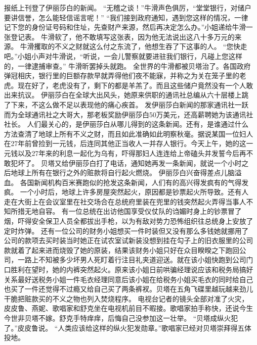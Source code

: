 \documentclass[a4paper,12pt,UTF8,twoside]{ctexbook}
\begin{document}
        报纸上刊登了伊丽莎白的新闻。  
        “无稽之谈！”牛滑声色俱厉，“堂堂银行，对储户要讲信誉，怎么能轻信谣言呢！”  
        “我们接到政府通知，遇到您这样的情况，一律记下您的身份证号码和住址，先查财产来源，然后再决定怎么办。”小姐递给牛滑一张登记表。  
        牛滑软了，他不敢填写这张表，因为他无法说出这八十多万元的来源。  
        牛滑攫取的不义之财就这么付之东流了，他想生吞了下这事的人。  
        “您快走吧。”小姐小声对牛滑说，“听说，一会儿警察就要进驻我们银行，凡碰上您这样的，一律逮捕审查。”  
        牛滑昕罢掉头就跑。  
        全世界的牛滑都被贝塔治了。各国政府弹冠相庆，银行里的巨额存款早就弄得他们夜不能寐，并称之为关在笼子里的老虎。现在好了，老虎没有了，剩下的都是羊羔了。而且这些储户竟然没有一个人敢出来抗议。  
        伊丽莎白在全球大出风头，她原来供职的通讯社总编从六十层楼上跳了下来，不这么做不足以表现他的痛心疾首。  
        发伊丽莎白新闻的那家通讯社一跃而为全球通讯社之大哥大，那老板奖励伊丽莎白50万美元，还高薪聘她为该通讯社社长。  
        人们最关心的，是伊丽莎白从哪儿得到的这条新闻。还有，是谁通过什么方法查清了地球上所有不义之财，而且如此准确如此明察秋毫。据说某国一位妇人在27年前曾捡到一元钱，后连同其他正当收人一并存人银行。今天上午，她的这一元钱以及27年来的利息一起化为乌有，吓得那妇人连连给上帝磕头并发誓今后再不敢犯坏了。  
        贝塔又给伊丽莎白打了电话，通知她再发一条新闻，就说一个小时之后地球上所有在银行之外的赃款将自行起火燃烧。  
        伊丽莎白兴奋得差点儿脑溢血。  
        各国新闻机构百米赛跑似的抢发这条新闻，人们有的高兴得发疯有的气得发疯。  
        一个小时后，地球上许多房屋突然起火，原因都是钞票起火所导致。还有人走在大街上在会议室里在社交场合在总统府里装在兜里的钱突然起火弄得当事人不知所措无地自容。  
        有一位总统在出访他国享受仪仗队的诌媚时身上的钞票冒了烟，吓得安全保卫人员全都拔出手枪，以为有敌对势力恐怖组织往总统身上安放了定时炸弹。  
        还有一位公司的财务小姐想买一件时装但又没有那么多钱她就挪用了公司的款项去买时装当时她正在试农室试新装没想到挂在勾子上的旧衣服里的公司款就着了起来进而烧毁了她的原装，结果该财务小姐只好在众目睽暌之下跑回公司，一路上不知被多少坏男人死盯着行注目礼夹道迎送。就在该小姐快跑到公司门口胜利在望时，她的内裤突然起火。原来该小姐日前哄骗经理说应该和税务局搞好关系最好送税务小姐一件毛衣经理同意后该小姐在给税务小姐买毛衣的同时给自己也买了一件还觉得不过瘾又给自己买了两条裤衩。贝塔在五角飞碟里越玩越来劲儿干脆把赃款买的不义之物也列入焚烧程序。  
        电视台记者的镜头全部对准了火灾，皮皮鲁、燕妮、歌唱家和舒克坐在电视机前目不暇接。歌唱家拍手称快，还说今生今世非贝塔不嫁。舒克手特痒痒，后悔自己没参加这一壮举。  
        “贝塔成纵火犯了。”皮皮鲁说。  
        “人类应该给这样的纵火犯发勋章。”歌唱家已经对贝塔崇拜得五体投地。  
\end{document}
